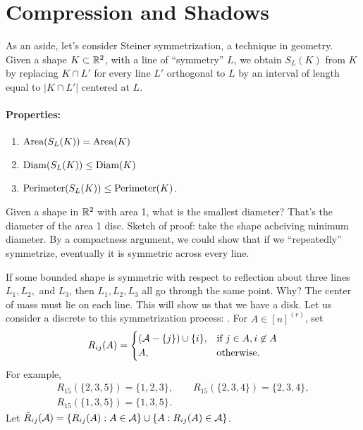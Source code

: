 
\section{Compression and Shadows} %
As an aside, let's consider Steiner symmetrization, a technique in geometry.
Given a shape $K\subset \mathbb{R}^2$, with a line of ``symmetry'' $L$, we obtain $S_L(K)$ from $K$ by replacing $K\cap L'$ for every line $L'$ orthogonal to $L$ by an interval of length equal to $|K\cap L'|$ centered at $L$.
\paragraph{Properties:}
\begin{enumerate}
	\item $\operatorname{Area}(S_L(K)) = \operatorname{Area}(K)$
	\item $\operatorname{Diam}(S_L(K)) \leq \operatorname{Diam} (K)$ 
	\item $\operatorname{Perimeter}(S_L(K)) \leq \operatorname{Perimeter}(K)$.
\end{enumerate}
Given a shape in $\mathbb{R}^2$ with area 1, what is the smallest diameter? That's the diameter of the area 1 disc. Sketch of proof: take the shape acheiving minimum diameter. By a compactness argument, we could show that if we ``repeatedly'' symmetrize, eventually it is symmetric across every line.

If some bounded shape is symmetric with respect to reflection about three lines $L_1, L_2,$ and $L_3$, then $L_1,L_2,L_3$ all go through the same point. Why? The center of mass must lie on each line.
This will show us that we have a disk. Let us consider a discrete to this symmetrization process: .
For $A\in [n]^{(r)}$, set
\[
R_{ij}(A) = \begin{cases}
(\mathcal{A}- \{j\})\cup \{i\}, & \text{if } j\in A, i\not \in A\\
A, & \text{otherwise}.
\end{cases}
\]
For example,
\begin{gather*}	
R_{15}(\{2,3,5\}) = \{1,2,3\}, \qquad
R_{15}(\{2,3,4\}) = \{2,3,4\},\\
R_{15}(\{1,3,5\}) = \{1,3,5\}.
\end{gather*}
Let $\tilde{R}_{ij}(\mathcal{A}) = \{R_{ij}(A): A\in \mathcal{A}\} \cup \{A: R_{ij}(A)\in \mathcal{A} \}$. 

